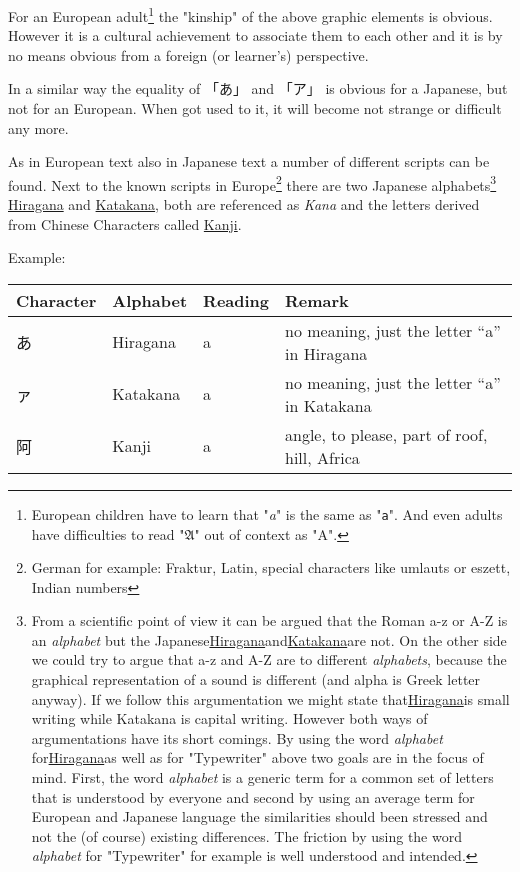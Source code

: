 For an European adult\footnote{European children have to learn that
"\textit{a}" is the same as "\texttt{a}". And even adults have difficulties to
read "$\mathfrak{A}$" out of context as "A".}  the "kinship" of the above
graphic elements is obvious. However it is a cultural achievement to associate
them to each other and it is by no means obvious from a foreign (or learner's)
perspective. 

In a similar way the equality of {「あ」} and {「ア」} is obvious for a
Japanese, but not for an European. When got used to it, it will become not
strange or difficult any more.

As in European text also in Japanese text a number of different scripts can be
found. Next to the known scripts in Europe\footnote{German for example:
Fraktur, Latin, special characters like umlauts or eszett, Indian numbers}
there are two Japanese alphabets\footnote{ From a scientific point of view it
can be argued that the Roman a-z or A-Z is an \textit{alphabet} but the
Japanese\hyperref[sec:Hiragana]{Hiragana}and\hyperref[sec:Katakana]{Katakana}are
not. On the other side we could try to argue that a-z and A-Z are to different
\textit{alphabets}, because the graphical representation of a sound is
different (and alpha is Greek letter anyway). If we follow this argumentation
we might state that\hyperref[sec:Hiragana]{Hiragana}is small writing while
Katakana is capital writing. However both ways of argumentations have its short
comings. By using the word \textit{alphabet}
for\hyperref[sec:Hiragana]{Hiragana}as well as for "Typewriter" above two goals
are in the focus of mind. First, the word \textit{alphabet} is a generic term
for a common set of letters that is understood by everyone and second by using
an average term for European and Japanese language the similarities should been
stressed and not the (of course) existing differences. The friction by using
the word \textit{alphabet} for "Typewriter" for example is well understood and
intended. } \hyperref[sec:Hiragana]{Hiragana} and
\hyperref[sec:Katakana]{Katakana}, both are referenced as \textit{Kana} and the
letters derived from Chinese Characters called \hyperref[sec:Kanji]{Kanji}.

Example:

\begin{center}
\begin{tabular}{|l|l|l|l|}
\textbf{Character}&\textbf{Alphabet}&\textbf{Reading}&\textbf{Remark}\\\hline
あ& Hiragana & a & no meaning, just the letter  ``a'' in Hiragana \\
ァ& Katakana & a & no meaning, just the letter ``a'' in Katakana \\
阿& Kanji    & a & { angle, to please, part of roof, hill, Africa}\\
\end{tabular}
\end{center}

